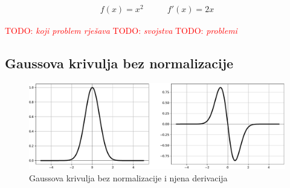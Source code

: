 \documentclass[times, utf8, numeric, diplomski]{fer}
\def\TODO#1{\noindent\textcolor{red}{TODO: \textit{#1}}\newline}
\def\todo#1{\TODO{#1}}
\begin{document}
\begin{equation}
\begin{split}
f(x) = x^2
\end{split}
\qquad
\begin{split}
f'(x) = 2x
\end{split}
\end{equation}

\todo{koji problem rješava}
\todo{svojstva}
\todo{problemi}
\fi %

%

\iffalse %
\subsection{Gaussova krivulja bez normalizacije}

\begin{figure}[H]
\includegraphics[width=\textwidth]{func_Gauss.pdf}
\centering
\caption{Gaussova krivulja bez normalizacije i njena derivacija}
\label{fig:gauss}
\end{figure}
\end{document}
